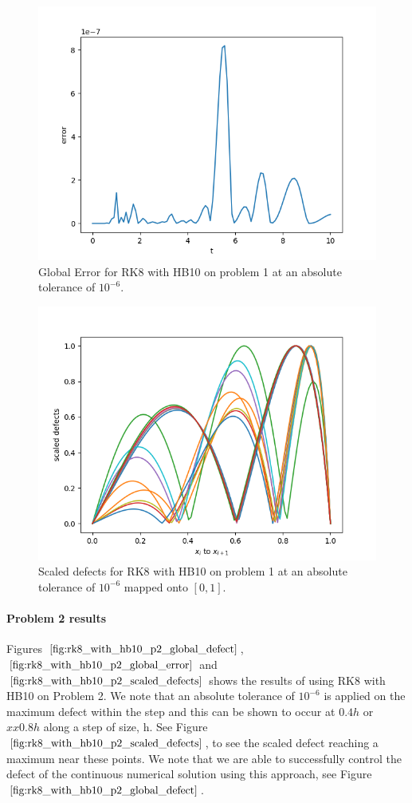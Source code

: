 \begin{figure}[H]
\centering
\includegraphics[width=0.7\linewidth]{./figures/rk8_with_hb10_p1_global_error}
\caption{Global Error for RK8 with HB10 on problem 1 at an absolute tolerance of $10^{-6}$.}
\label{fig:rk8_with_hb10_p1_global_error}
\end{figure}

\begin{figure}[H]
\centering
\includegraphics[width=0.7\linewidth]{./figures/rk8_with_hb10_p1_scaled_defects}
\caption{Scaled defects for RK8 with HB10 on problem 1 at an absolute tolerance of $10^{-6}$  mapped onto $[0, 1]$.}
\label{fig:rk8_with_hb10_p1_scaled_defects}
\end{figure}

\paragraph{Problem 2 results}
Figures $\ref{fig:rk8_with_hb10_p2_global_defect}$, $\ref{fig:rk8_with_hb10_p2_global_error}$ and $\ref{fig:rk8_with_hb10_p2_scaled_defects}$ shows the results of using RK8 with HB10 on Problem 2. We note that an absolute tolerance of $10^{-6}$ is applied on the maximum defect within the step and this can be shown to occur at $0.4h$ or $xx0.8h$ along a step of size, h. See Figure $\ref{fig:rk8_with_hb10_p2_scaled_defects}$, to see the scaled defect reaching a maximum near these points. We note that we are able to successfully control the defect of the continuous numerical solution using this approach, see Figure $\ref{fig:rk8_with_hb10_p2_global_defect}$. 

